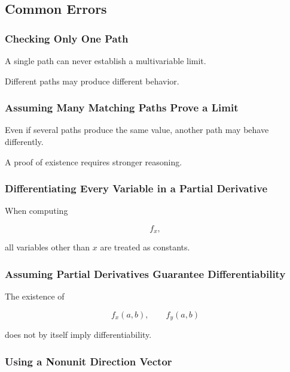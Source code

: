 \subsection{Common Errors}
\label{subsec:multivariable-common-errors}

\subsubsection{Checking Only One Path}

A single path can never establish a multivariable limit.

Different paths may produce different behavior.

\subsubsection{Assuming Many Matching Paths Prove a Limit}

Even if several paths produce the same value, another path may behave
differently.

A proof of existence requires stronger reasoning.

\subsubsection{Differentiating Every Variable in a Partial Derivative}

When computing

\[ f_x, \]

all variables other than \(x\) are treated as constants.

\subsubsection{Assuming Partial Derivatives Guarantee Differentiability}

The existence of

\[ f_x(a,b),\qquad f_y(a,b) \]

does not by itself imply differentiability.

\subsubsection{Using a Nonunit Direction Vector}

